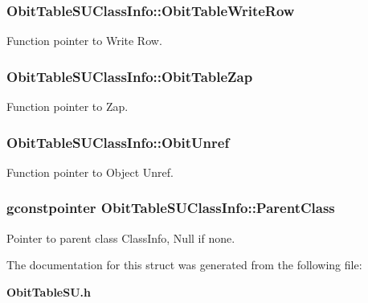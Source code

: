 \subsubsection{ {\bf Obit\-Table\-SUClass\-Info::Obit\-Table\-Write\-Row}}\label{structObitTableSUClassInfo_o26}


Function pointer to Write Row. 

\subsubsection{ {\bf Obit\-Table\-SUClass\-Info::Obit\-Table\-Zap}}\label{structObitTableSUClassInfo_o19}


Function pointer to Zap. 

\subsubsection{ {\bf Obit\-Table\-SUClass\-Info::Obit\-Unref}}\label{structObitTableSUClassInfo_o11}


Function pointer to Object Unref. 

\subsubsection{\setlength{\rightskip}{0pt plus 5cm}gconstpointer {\bf Obit\-Table\-SUClass\-Info::Parent\-Class}}\label{structObitTableSUClassInfo_o3}


Pointer to parent class Class\-Info, Null if none. 



The documentation for this struct was generated from the following file:\begin{CompactItemize}
\item 
{\bf Obit\-Table\-SU.h}\end{CompactItemize}
